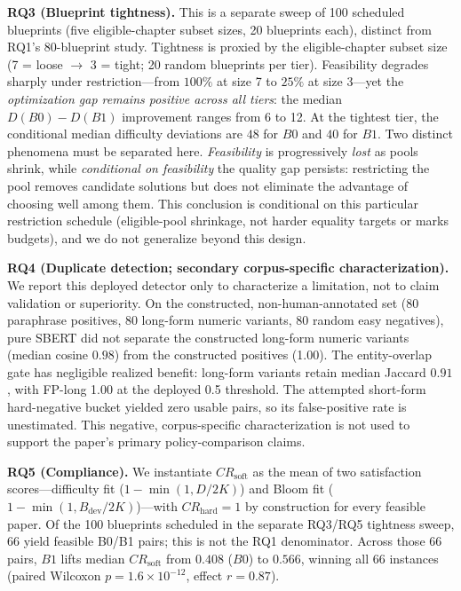 \documentclass[runningheads]{llncs}
\begin{document}
\noindent\textbf{RQ3 (Blueprint tightness).} This is a separate sweep of 100 scheduled blueprints (five eligible-chapter subset sizes, 20 blueprints each), distinct from RQ1's 80-blueprint study.
Tightness is proxied by the eligible-chapter subset size (7 = loose $\to$ 3 = tight; 20 random blueprints per tier).
Feasibility degrades sharply under restriction---from $100\%$ at size 7 to $25\%$ at size 3---yet the \emph{optimization gap remains positive across all tiers}: the median $D(B0)-D(B1)$ improvement ranges from 6 to 12. At the tightest tier, the conditional median difficulty deviations are $48$ for $B0$ and $40$ for $B1$.
Two distinct phenomena must be separated here. \emph{Feasibility} is progressively \emph{lost} as pools shrink, while \emph{conditional on feasibility} the quality gap persists: restricting the pool removes candidate solutions but does not eliminate the advantage of choosing well among them.
This conclusion is conditional on this particular restriction schedule (eligible-pool shrinkage, not harder equality targets or marks budgets), and we do not generalize beyond this design.

\noindent\textbf{RQ4 (Duplicate detection; secondary corpus-specific characterization).} We report this deployed detector only to characterize a limitation, not to claim validation or superiority.
On the constructed, non-human-annotated set (80 paraphrase positives, 80 long-form numeric variants, 80 random easy negatives), pure SBERT did not separate the constructed long-form numeric variants (median cosine $0.98$) from the constructed positives (1.00).
The entity-overlap gate has negligible realized benefit: long-form variants retain median Jaccard $0.91$, with FP-long 1.00 at the deployed 0.5 threshold.
The attempted short-form hard-negative bucket yielded zero usable pairs, so its false-positive rate is unestimated.
This negative, corpus-specific characterization is not used to support the paper's primary policy-comparison claims.

\noindent\textbf{RQ5 (Compliance).} We instantiate $CR_{\mathrm{soft}}$ as the mean of two satisfaction scores---difficulty fit ($1-\min(1,D/2K)$) and Bloom fit ($1-\min(1,B_{\mathrm{dev}}/2K)$)---with $CR_{\mathrm{hard}}=1$ by construction for every feasible paper.
Of the 100 blueprints scheduled in the separate RQ3/RQ5 tightness sweep, 66 yield feasible B0/B1 pairs;
this is not the RQ1 denominator. Across those 66 pairs, $B1$ lifts median $CR_{\mathrm{soft}}$ from $0.408$ ($B0$) to $0.566$, winning all 66 instances (paired Wilcoxon $p=1.6{\times}10^{-12}$, effect $r=0.87$).
\end{document}

